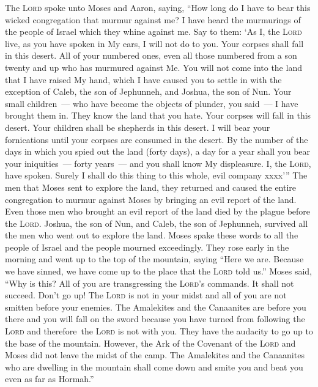 \begin{inparaenum}
   The \textsc{Lord} spoke unto Moses and Aaron, saying,%
   ``How long do I have to bear this wicked congregation that murmur against me? I have heard the murmurings of the people of Israel which they whine against me.%
   Say to them: `As I, the \textsc{Lord} live, as you have spoken in My ears, I will not do to you.%
   Your corpses shall fall in this desert. All of your numbered ones, even all those numbered from a son twenty and up who has murmured against Me.%
   You will not come into the land that I have raised My hand, which I have caused you to settle in with the exception of Caleb, the son of Jephunneh, and Joshua, the son of Nun.%
   Your small children~--- who have become the objects of plunder, you said~--- I have brought them in. They know the land that you hate.%
   Your corpses will fall in this desert.%
   Your children shall be shepherds in this desert. I will bear your fornications until your corpses are consumed in the desert.%
   By the number of the days in which you spied out the land (forty days), a day for a year shall you bear your iniquities~--- forty years~--- and you shall know My displeasure.%
   I, the \textsc{Lord}, have spoken. Surely I shall do this thing to this whole, evil company xxxx'\thinspace''%
   The men that Moses sent to explore the land, they returned and caused the entire congregation to murmur against Moses by bringing an evil report of the land.%
   Even those men who brought an evil report of the land died by the plague before the \textsc{Lord}.%
   Joshua, the son of Nun, and Caleb, the son of Jephunneh, survived all the men who went out to explore the land.%
   Moses spake these words to all the people of Israel and the people mourned exceedingly.%
   They rose early in the morning and went up to the top of the mountain, saying ``Here we are. Because we have sinned, we have come up to the place that the \textsc{Lord} told us.''%
   Moses said, ``Why is this? All of you are transgressing the \textsc{Lord}'s commands. It shall not succeed.%
   Don't go up! The \textsc{Lord} is not in your midst and all of you are not smitten before your enemies.%
   The Amalekites and the Canaanites are before you there and you will fall on the sword because you have turned from following the \textsc{Lord} and therefore\understood\ the \textsc{Lord} is not with you.%
   They have the audacity to go up to the base of the mountain. However, the Ark of the Covenant of the \textsc{Lord} and Moses did not leave the midst of the camp.%
   The Amalekites and the Canaanites who are dwelling in the mountain shall come down and smite you and beat you even as far as Hormah.''%
\end{inparaenum}
